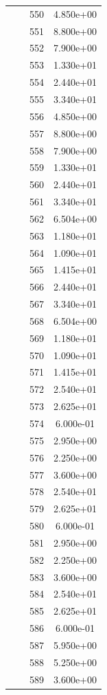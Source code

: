 \documentclass[12pt]{article}
\begin{document}
\begin{longtable}{@{}cccc@{}}
 &  & 550 & 4.850e+00 \\
 &  & 551 & 8.800e+00 \\
 &  & 552 & 7.900e+00 \\
 &  & 553 & 1.330e+01 \\
 &  & 554 & 2.440e+01 \\
 &  & 555 & 3.340e+01 \\
 &  & 556 & 4.850e+00 \\
 &  & 557 & 8.800e+00 \\
 &  & 558 & 7.900e+00 \\
 &  & 559 & 1.330e+01 \\
 &  & 560 & 2.440e+01 \\
 &  & 561 & 3.340e+01 \\
 &  & 562 & 6.504e+00 \\
 &  & 563 & 1.180e+01 \\
 &  & 564 & 1.090e+01 \\
 &  & 565 & 1.415e+01 \\
 &  & 566 & 2.440e+01 \\
 &  & 567 & 3.340e+01 \\
 &  & 568 & 6.504e+00 \\
 &  & 569 & 1.180e+01 \\
 &  & 570 & 1.090e+01 \\
 &  & 571 & 1.415e+01 \\
 &  & 572 & 2.540e+01 \\
 &  & 573 & 2.625e+01 \\
 &  & 574 & 6.000e-01 \\
 &  & 575 & 2.950e+00 \\
 &  & 576 & 2.250e+00 \\
 &  & 577 & 3.600e+00 \\
 &  & 578 & 2.540e+01 \\
 &  & 579 & 2.625e+01 \\
 &  & 580 & 6.000e-01 \\
 &  & 581 & 2.950e+00 \\
 &  & 582 & 2.250e+00 \\
 &  & 583 & 3.600e+00 \\
 &  & 584 & 2.540e+01 \\
 &  & 585 & 2.625e+01 \\
 &  & 586 & 6.000e-01 \\
 &  & 587 & 5.950e+00 \\
 &  & 588 & 5.250e+00 \\
 &  & 589 & 3.600e+00 \\

\end{longtable}
\end{document}
